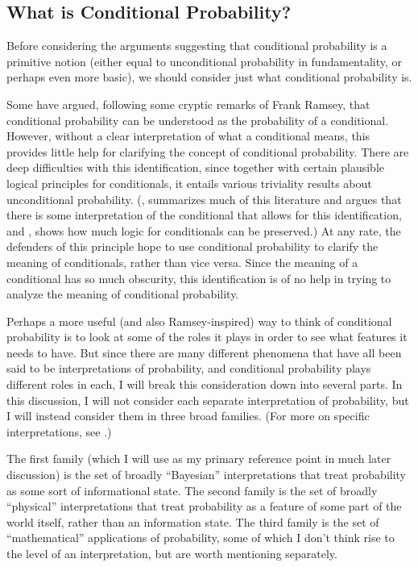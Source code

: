 \subsection{What is Conditional Probability?}\label{whatis}

Before considering the arguments suggesting that conditional probability is a primitive notion (either equal to unconditional probability in fundamentality, or perhaps even more basic), we should consider just what conditional probability is.

Some have argued, following some cryptic remarks of Frank Ramsey, that conditional probability can be understood as the probability of a conditional. However, without a clear interpretation of what a conditional means, this provides little help for clarifying the concept of conditional probability. There are deep difficulties with this identification, since together with certain plausible logical principles for conditionals, it entails various triviality results about unconditional probability. (\citealp{edgington}, summarizes much of this literature and argues that there is some interpretation of the conditional that allows for this identification, and \citealp{baconstalnaker}, shows how much logic for conditionals can be preserved.) At any rate, the defenders of this principle hope to use conditional probability to clarify the meaning of conditionals, rather than vice versa. Since the meaning of a conditional has so much obscurity, this identification is of no help in trying to analyze the meaning of conditional probability.

Perhaps a more useful (and also Ramsey-inspired) way to think of conditional probability is to look at some of the roles it plays in order to see what features it needs to have. But since there are many different phenomena that have all been said to be interpretations of probability, and conditional probability plays different roles in each, I will break this consideration down into several parts. In this discussion, I will not consider each separate interpretation of probability, but I will instead consider them in three broad families. (For more on specific interpretations, see \citealp{interp}.)

The first family (which I will use as my primary reference point in much later discussion) is the set of broadly ``Bayesian'' interpretations that treat probability as some sort of informational state. The second family is the set of broadly ``physical'' interpretations that treat probability as a feature of some part of the world itself, rather than an information state. The third family is the set of ``mathematical'' applications of probability, some of which I don't think rise to the level of an interpretation, but are worth mentioning separately.

